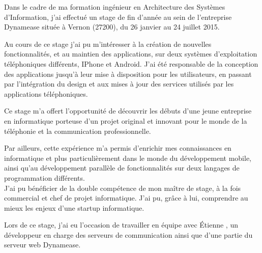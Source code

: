 Dans le cadre de ma formation ingénieur en Architecture des Systèmes d'Information, j’ai effectué un stage de fin d'année au sein de l'entreprise Dynamease située à Vernon (27200), du 26 janvier au 24 juillet 2015.

Au cours de ce stage j’ai pu m’intéresser à la création de nouvelles fonctionnalités, et au maintien des applications, sur deux systèmes d'exploitation téléphoniques différents, IPhone et Android. J'ai été responsable de la conception des applications jusqu'à leur mise à disposition pour les utilisateurs, en passant par l’intégration du design et aux mises à jour des services utilisés par les applications téléphoniques.

Ce stage m’a offert l’opportunité de découvrir les débuts d’une jeune entreprise en informatique porteuse d’un projet original et innovant pour le monde de la téléphonie et la communication professionnelle.

Par ailleurs, cette expérience m’a permis d’enrichir mes connaissances en informatique et plus particulièrement dans le monde du développement mobile, ainsi qu'au développement parallèle de fonctionnalités sur deux langages de programmation différents.\\


J’ai pu bénéficier de la double compétence de mon maître de stage, à la fois commercial et chef de projet informatique. J’ai pu, grâce à lui, comprendre au mieux les enjeux d’une startup informatique.

Lors de ce stage, j’ai eu l’occasion de travailler en équipe avec Étienne , un développeur en charge des serveurs de communication ainsi que d'une partie du serveur web Dynamease.